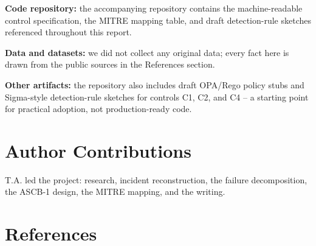\documentclass[10pt]{article}
\begin{document}
\textbf{Code repository:} the accompanying repository contains the
machine-readable control specification, the MITRE mapping table, and
draft detection-rule sketches referenced throughout this report.

\textbf{Data and datasets:} we did not collect any original data; every
fact here is drawn from the public sources in the References section.

\textbf{Other artifacts:} the repository also includes draft OPA/Rego
policy stubs and Sigma-style detection-rule sketches for controls C1,
C2, and C4 -- a starting point for practical adoption, not
production-ready code.

\hypertarget{author-contributions}{%
\section*{Author Contributions}\label{author-contributions}}

T.A. led the project: research, incident reconstruction, the failure
decomposition, the ASCB-1 design, the MITRE mapping, and the writing.

\hypertarget{references}{%
\section*{References}\label{references}}
\end{document}
